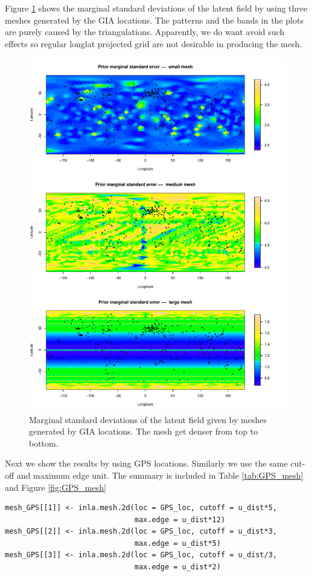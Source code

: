 \documentclass[a4paper,12pt]{article}
\begin{document}
Figure \ref{fig:GIA_mesh} shows the marginal standard deviations of the latent field by using three meshes generated by the GIA locations. The patterns and the bands in the plots are purely caused by the triangulations. Apparently, we do want avoid such effects so regular longlat projected grid are not desirable in producing the mesh.
\begin{figure}[htbp]
 \begin{center}
 \includegraphics[scale=0.8]{fig/prior_GIAmesh.pdf}
 \end{center}
 \caption[GIA mesh]{Marginal standard deviations of the latent field given by meshes generated by GIA locations. The mesh get denser from top to bottom.}
 \label{fig:GIA_mesh}
 \end{figure} 
 
Next we show the results by using GPS locations. Similarly we use the same cut-off and maximum edge unit. The summary is included in Table \ref{tab:GPS_mesh} and Figure \ref{fig:GPS_mesh}
\begin{verbatim}
mesh_GPS[[1]] <- inla.mesh.2d(loc = GPS_loc, cutoff = u_dist*5,  
                              max.edge = u_dist*12)
mesh_GPS[[2]] <- inla.mesh.2d(loc = GPS_loc, cutoff = u_dist*3,
                              max.edge = u_dist*5)
mesh_GPS[[3]] <- inla.mesh.2d(loc = GPS_loc, cutoff = u_dist/3, 
                              max.edge = u_dist*2)
\end{verbatim} 
\end{document}
